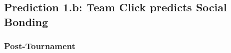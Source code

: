 \begin{CJK}{UTF8}{gbsn}



  \subsection{Prediction 1.b: Team Click predicts Social Bonding \label{app8:MLM2}}

       \subsubsection{Post-Tournament\label{app8:MLM2a}}




        


\end{CJK}
